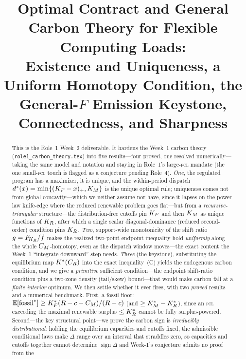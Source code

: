 \title[Optimal Contract and General Carbon Theory (Week 2)]
{Optimal Contract and General Carbon Theory for Flexible Computing Loads:\\
Existence and Uniqueness, a Uniform Homotopy Condition, the\\
General-$F$ Emission Keystone, Connectedness, and Sharpness}



\begin{abstract}
This is the Role~1 Week~2 deliverable. It hardens the Week~1 carbon theory
(\texttt{role1\_carbon\_theory.tex}) into five results---four proved, one resolved
numerically---taking the same model and notation and staying in Role~1's
large-\textsc{fcl} mandate (the one small-\textsc{fcl} touch is flagged as a
conjecture pending Role~4). \emph{One},
the regulated program has a maximizer, it is unique, and the within-period
dispatch $d^{*}(x)=\min\{(K_F-x)_+,K_M\}$ is the unique optimal rule; uniqueness
comes not from global concavity---which we neither assume nor have, since it lapses
on the power-law knife-edge where the reduced renewable problem goes flat---but
from a \emph{recursive-triangular} structure---the distribution-free
cutoffs pin $K_F$ and then $K_M$ as unique functions of $K_R$, after which a
single scalar diagonal-dominance (reduced second-order) condition pins $K_R$.
\emph{Two}, support-wide monotonicity of the shift ratio
$g=F_{\!K_R}/f$ makes the realized two-point endpoint inequality hold \emph{uniformly}
along the whole $C_M$-homotopy, even as the dispatch window moves---the exact
content the Week~1 ``integrate-downward'' step needs. \emph{Three} (the
keystone), substituting the equilibrium map $K^{*}(C_R)$ into the exact
inequality~(C) yields the endogenous carbon condition, and we give a
\emph{primitive} sufficient condition---the endpoint shift-ratio condition plus a
two-zone density (tail/skew) bound---that would make carbon fall at a
\emph{finite interior} optimum. We then settle whether it ever fires, with two
\emph{proved} results and a numerical benchmark. First, a fossil floor:
$\mathbb{E}[\text{fossil}^{*}]\ge K_F^{*}(R-c-C_M)/(R-c)$ (and $\ge K_M^{*}-K_R^{*}$), since an
\textsc{fcl} exceeding the maximal renewable surplus $\le K_R^{*}$ cannot be fully
surplus-powered. Second---the key structural point---we prove the carbon sign is
\emph{irreducibly distributional}: holding the equilibrium capacities and cutoffs
fixed, the admissible conditional laws make $\Delta$ range over an interval that
straddles zero, so capacities and cutoffs together cannot determine
$\operatorname{sign}\Delta$ and Week-1's conjecture admits no proof from the

\end{abstract}
